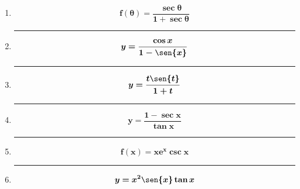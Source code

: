 \documentclass[12pt]{article}
\begin{document}
\begin{enumerate}[label=\textbf{\arabic*)}]
            \hrule\item \[\bm{f(\theta) = \frac{\sec{\theta}}{1 + \sec{\theta}}}\]
            \hrule\item \[\bm{y = \frac{\cos{x}}{1 - \sen{x}}}\]
            \hrule\item \[\bm{y = \frac{t \sen{t}}{1 + t}}\]
            \hrule\item \[\bm{y = \frac{1 - \sec{x}}{\tan{x}}}\]
            \hrule\item \[\bm{f(x) = xe^x \csc{x}}\]
            \hrule\item \[\bm{y = x^2 \sen{x}\tan{x}}\]
        \end{enumerate}
\end{document}
